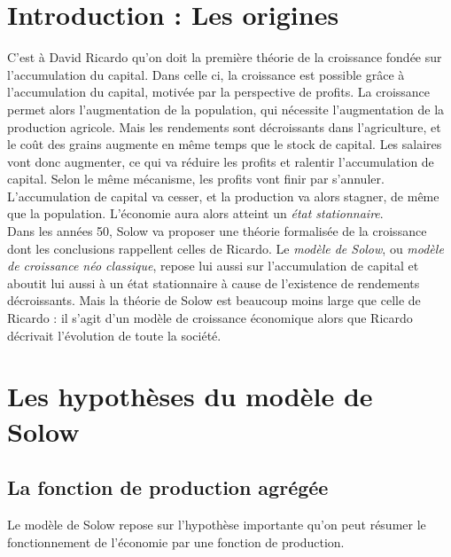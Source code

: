 \documentclass[10pt]{book}
\begin{document}
\section{Introduction : Les origines}
C'est à David Ricardo qu'on doit la première théorie de la croissance fondée sur l'accumulation du capital. Dans celle ci, la croissance est possible grâce à l'accumulation du capital, motivée par la perspective de profits. La croissance permet alors l'augmentation de la population, qui nécessite l'augmentation de la production agricole. Mais les rendements sont décroissants dans l'agriculture, et le coût des grains augmente en même temps que le stock de capital. Les salaires vont donc augmenter, ce qui va réduire les profits et ralentir l'accumulation de capital. Selon le même mécanisme, les profits vont finir par s'annuler. L'accumulation de capital va cesser, et la production va alors stagner, de même que la population. L'économie aura alors atteint un \textit{état stationnaire}. \\
Dans les années 50, Solow va proposer une théorie formalisée de la croissance dont les conclusions rappellent celles de Ricardo. Le \textit{modèle de Solow}, ou \textit{modèle de croissance néo classique}, repose lui aussi sur l'accumulation de capital et aboutit lui aussi à un état stationnaire à cause de l'existence de rendements décroissants. Mais la théorie de Solow est beaucoup moins large que celle de Ricardo : il s'agit d'un modèle de croissance économique alors que Ricardo décrivait l'évolution de toute la société.
\section{Les hypothèses du modèle de Solow}
\subsection{La fonction de production agrégée}
Le modèle de Solow repose sur l'hypothèse importante qu'on peut résumer le fonctionnement de l'économie par une fonction de production.
\end{document}

